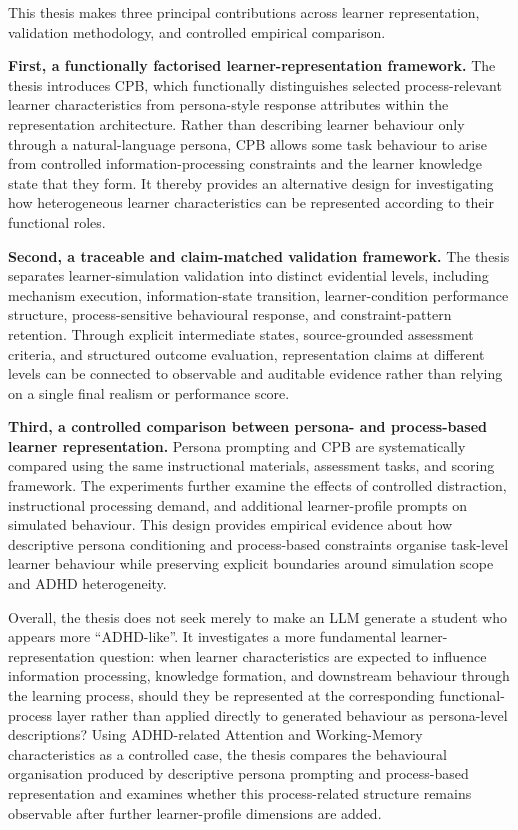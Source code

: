 This thesis makes three principal contributions across learner representation, validation methodology, and controlled empirical comparison.

\textbf{First, a functionally factorised learner-representation framework.} The thesis introduces CPB, which functionally distinguishes selected process-relevant learner characteristics from persona-style response attributes within the representation architecture. Rather than describing learner behaviour only through a natural-language persona, CPB allows some task behaviour to arise from controlled information-processing constraints and the learner knowledge state that they form. It thereby provides an alternative design for investigating how heterogeneous learner characteristics can be represented according to their functional roles.

\textbf{Second, a traceable and claim-matched validation framework.} The thesis separates learner-simulation validation into distinct evidential levels, including mechanism execution, information-state transition, learner-condition performance structure, process-sensitive behavioural response, and constraint-pattern retention. Through explicit intermediate states, source-grounded assessment criteria, and structured outcome evaluation, representation claims at different levels can be connected to observable and auditable evidence rather than relying on a single final realism or performance score.

\textbf{Third, a controlled comparison between persona- and process-based learner representation.} Persona prompting and CPB are systematically compared using the same instructional materials, assessment tasks, and scoring framework. The experiments further examine the effects of controlled distraction, instructional processing demand, and additional learner-profile prompts on simulated behaviour. This design provides empirical evidence about how descriptive persona conditioning and process-based constraints organise task-level learner behaviour while preserving explicit boundaries around simulation scope and ADHD heterogeneity.

Overall, the thesis does not seek merely to make an LLM generate a student who appears more ``ADHD-like''. It investigates a more fundamental learner-representation question: when learner characteristics are expected to influence information processing, knowledge formation, and downstream behaviour through the learning process, should they be represented at the corresponding functional-process layer rather than applied directly to generated behaviour as persona-level descriptions? Using ADHD-related Attention and Working-Memory characteristics as a controlled case, the thesis compares the behavioural organisation produced by descriptive persona prompting and process-based representation and examines whether this process-related structure remains observable after further learner-profile dimensions are added.

